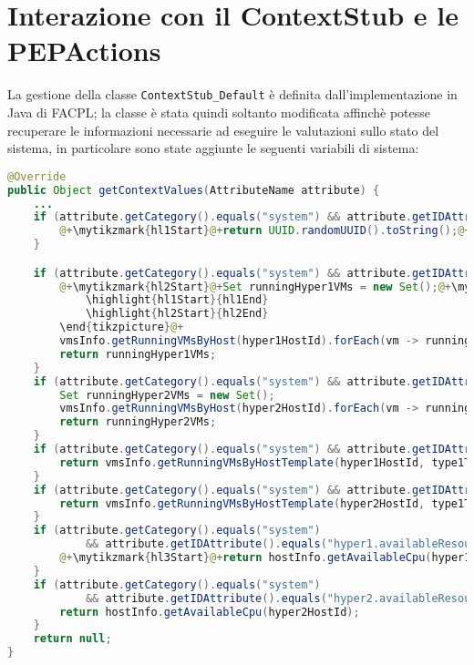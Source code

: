 \section{Interazione con il ContextStub e le PEPActions}
La gestione della classe \texttt{ContextStub\_Default} è definita dall'implementazione in Java di FACPL; la classe è stata quindi soltanto modificata affinchè potesse recuperare le informazioni necessarie ad eseguire le valutazioni sullo stato del sistema, in particolare sono state aggiunte le seguenti variabili di sistema:
\begin{lstlisting}[language=Java, caption=Context di OpenNebula, label=code:ContextStubChoice, basicstyle=\fontsize{9}{10}\ttfamily]
@Override
public Object getContextValues(AttributeName attribute) {
    ...
    if (attribute.getCategory().equals("system") && attribute.getIDAttribute().equals("vm-name")) {
        @+\mytikzmark{hl1Start}@+return UUID.randomUUID().toString();@+\mytikzmark{hl1End}@+
    }

    if (attribute.getCategory().equals("system") && attribute.getIDAttribute().equals("hyper1.vm-names")) {
        @+\mytikzmark{hl2Start}@+Set runningHyper1VMs = new Set();@+\mytikzmark{hl2End}@+@+\begin{tikzpicture}[remember picture, overlay]
            \highlight{hl1Start}{hl1End}
            \highlight{hl2Start}{hl2End}
        \end{tikzpicture}@+
        vmsInfo.getRunningVMsByHost(hyper1HostId).forEach(vm -> runningHyper1VMs.addValue(vm.getVmName()));
        return runningHyper1VMs;
    }
    if (attribute.getCategory().equals("system") && attribute.getIDAttribute().equals("hyper2.vm-names")) {
        Set runningHyper2VMs = new Set();
        vmsInfo.getRunningVMsByHost(hyper2HostId).forEach(vm -> runningHyper2VMs.addValue(vm.getVmName()));
        return runningHyper2VMs;
    }
    if (attribute.getCategory().equals("system") && attribute.getIDAttribute().equals("hyper1.vm1-counter")) {
        return vmsInfo.getRunningVMsByHostTemplate(hyper1HostId, type1Template).size();
    }
    if (attribute.getCategory().equals("system") && attribute.getIDAttribute().equals("hyper2.vm1-counter")) {
        return vmsInfo.getRunningVMsByHostTemplate(hyper2HostId, type1Template).size();
    }
    if (attribute.getCategory().equals("system")
            && attribute.getIDAttribute().equals("hyper1.availableResources")) {
        @+\mytikzmark{hl3Start}@+return hostInfo.getAvailableCpu(hyper1HostId);@+\mytikzmark{hl3End}@+
    }
    if (attribute.getCategory().equals("system")
            && attribute.getIDAttribute().equals("hyper2.availableResources")) {
        return hostInfo.getAvailableCpu(hyper2HostId);
    }
    return null;
}
\end{lstlisting}
